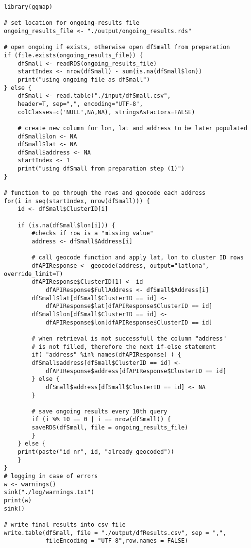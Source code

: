 \begin{lstlisting}[title=R code to geocode addresses (2)]
library(ggmap)

# set location for ongoing-results file
ongoing_results_file <- "./output/ongoing_results.rds"

# open ongoing if exists, otherwise open dfSmall from preparation 
if (file.exists(ongoing_results_file)) {
	dfSmall <- readRDS(ongoing_results_file)
	startIndex <- nrow(dfSmall) - sum(is.na(dfSmall$lon))
	print("using ongoing file as dfSmall")
} else {
	dfSmall <- read.table("./input/dfSmall.csv",
	header=T, sep=",", encoding="UTF-8",
	colClasses=c('NULL',NA,NA), stringsAsFactors=FALSE)
	
	# create new column for lon, lat and address to be later populated
	dfSmall$lon <- NA 
	dfSmall$lat <- NA  
	dfSmall$address <- NA
	startIndex <- 1
	print("using dfSmall from preparation step (1)")
}

# function to go through the rows and geocode each address
for(i in seq(startIndex, nrow(dfSmall))) {
	id <- dfSmall$ClusterID[i]
	
	if (is.na(dfSmall$lon[i])) {
		#checks if row is a "missing value"
		address <- dfSmall$Address[i]
		
		# call geocode function and apply lat, lon to cluster ID rows
		dfAPIResponse <- geocode(address, output="latlona", override_limit=T)
		dfAPIResponse$ClusterID[1] <- id
			dfAPIResponse$FullAddress <- dfSmall$Address[i]
		dfSmall$lat[dfSmall$ClusterID == id] <- 
			dfAPIResponse$lat[dfAPIResponse$ClusterID == id]
		dfSmall$lon[dfSmall$ClusterID == id] <- 
			dfAPIResponse$lon[dfAPIResponse$ClusterID == id]
			
		# when retrieval is not successfull the column "address"
		# is not filled, therefore the next if-else statement
		if( "address" %in% names(dfAPIResponse) ) {
		dfSmall$address[dfSmall$ClusterID == id] <- 
			dfAPIResponse$address[dfAPIResponse$ClusterID == id]
		} else {
			dfSmall$address[dfSmall$ClusterID == id] <- NA
		}
	
		# save ongoing results every 10th query
		if (i %% 10 == 0 | i == nrow(dfSmall)) {
		saveRDS(dfSmall, file = ongoing_results_file)  
		}
	} else {
	print(paste("id nr", id, "already geocoded"))
	}
}
# logging in case of errors 
w <- warnings()
sink("./log/warnings.txt")
print(w)
sink()

# write final results into csv file 
write.table(dfSmall, file = "./output/dfResults.csv", sep = ",",
			fileEncoding = "UTF-8",row.names = FALSE)
\end{lstlisting}

